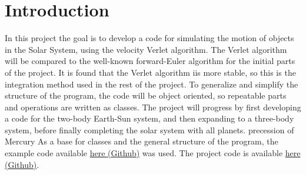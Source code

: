 \section{Introduction}
In this project the goal is to develop a code for simulating the motion of objects in the Solar System, using the velocity
Verlet algorithm. The Verlet algorithm will be compared to the well-known forward-Euler algorithm for the
initial parts of the project. It is found that the Verlet algorithm iis more stable, so this is the integration method used in the rest of the project.  
To generalize and simplify the structure of the program, 
the code will be object oriented, so repeatable parts and operations are written as classes.
The project will progress by first developing a code for the two-body Earth-Sun system, and then
expanding to a three-body system, before finally completing the solar system with all planets.
precession of Mercury
\newline
As a base for classes and the general structure of the program, the example code available
\href{https://github.com/andeplane/solar-system}{here (Github)} was used.
\newline
The project code is available 
\href{https://github.com/copperwire/project3/tree/master/project_3}{here (Github)}.
